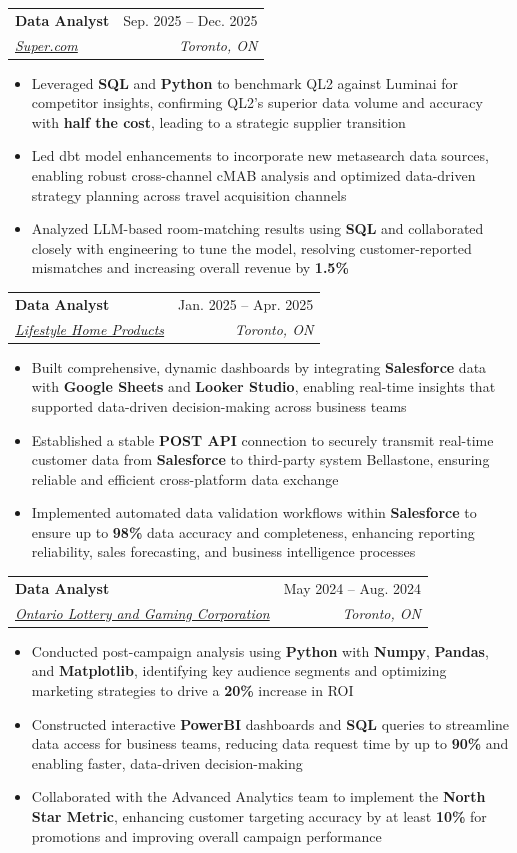 \documentclass[letterpaper,11pt]{article}
\makeatletter
\newcommand{\resumeItem}[1]{
  \item\small{
    {#1 \vspace{-2pt}}
  }
}
\newcommand{\resumeSubheading}[4]{
  \vspace{-2pt}\item
    \begin{tabular*}{0.97\textwidth}[t]{l@{\extracolsep{\fill}}r}
      \textbf{#1} & #2 \\[-3pt]
      \textit{\small#3} & \textit{\small #4} \\
    \end{tabular*}\vspace{-8pt}
}
\newcommand{\resumeItemListStart}{\begin{itemize}}
\newcommand{\resumeItemListEnd}{\end{itemize}\vspace{-5pt}}
\makeatother
\begin{document}
    \resumeSubheading
      {Data Analyst}{Sep. 2025 -- Dec. 2025}
      {\href{https://www.super.com/}{Super.com}}{Toronto, ON}
      \resumeItemListStart
        \resumeItem{Leveraged \textbf{SQL} and \textbf{Python} to benchmark QL2 against Luminai for competitor insights, confirming QL2's superior data volume and accuracy with \textbf{half the cost}, leading to a strategic supplier transition}
        \resumeItem{Led dbt model enhancements to incorporate new metasearch data sources, enabling robust cross-channel cMAB analysis and optimized data-driven strategy planning across travel acquisition channels}
        \resumeItem{Analyzed LLM-based room-matching results using \textbf{SQL} and collaborated closely with engineering to tune the model, resolving customer-reported mismatches and increasing overall revenue by \textbf{1.5\%}}
      \resumeItemListEnd 

    \resumeSubheading
      {Data Analyst}{Jan. 2025 -- Apr. 2025}
      {\href{https://lifestylesunrooms.com/}{Lifestyle Home Products}}{Toronto, ON}
      \resumeItemListStart
        \resumeItem{Built comprehensive, dynamic dashboards by integrating \textbf{Salesforce} data with \textbf{Google Sheets} and \textbf{Looker Studio}, enabling real-time insights that supported data-driven decision-making across business teams} 
        \resumeItem{Established a stable \textbf{POST API} connection to securely transmit real-time customer data from \textbf{Salesforce} to third-party system Bellastone, ensuring reliable and efficient cross-platform data exchange}
        \resumeItem{Implemented automated data validation workflows within \textbf{Salesforce} to ensure up to \textbf{98\%} data accuracy and completeness, enhancing reporting reliability, sales forecasting, and business intelligence processes}
      \resumeItemListEnd

    \resumeSubheading
      {Data Analyst}{May 2024 -- Aug. 2024}
      {\href{https://www.olg.ca/en/home.html}{Ontario Lottery and Gaming Corporation}}{Toronto, ON}
      \resumeItemListStart
        \resumeItem{Conducted post-campaign analysis using \textbf{Python} with \textbf{Numpy}, \textbf{Pandas}, and \textbf{Matplotlib}, identifying key audience segments and optimizing marketing strategies to drive a \textbf{20\%} increase in ROI}
        \resumeItem{Constructed interactive \textbf{PowerBI} dashboards and \textbf{SQL} queries to streamline data access for business teams, reducing data request time by up to \textbf{90\%} and enabling faster, data-driven decision-making}
        \resumeItem{Collaborated with the Advanced Analytics team to implement the \textbf{North Star Metric}, enhancing customer targeting accuracy by at least \textbf{10\%} for promotions and improving overall campaign performance}
      \resumeItemListEnd
\end{document}
